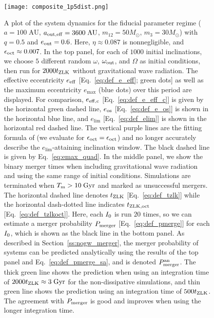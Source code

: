 \documentclass[
        fleqn,
        usenatbib,
    ]{mnras}
\newlength{\colummwidth}
\begin{document}
\begin{figure}
    \centering
    \texttt{[image: composite\_1p5dist.png]}
    \caption{A plot of the system dynamics for the fiducial parameter regime ($a
    = 100\;\mathrm{AU}$, $a_{\rm out, eff} = 3600\;\mathrm{AU}$, $m_{12} =
    50M_{\odot}$, $m_3 = 30M_{\odot}$) with $q = 0.5$ and $e_{\rm out} = 0.6$.
    Here, $\eta \approx 0.087$ is nonnegligible, and $\epsilon_{\rm oct} \approx
    0.007$. In the top panel, for each of $1000$ initial inclinations, we choose
    $5$ different random $\omega$, $\omega_{\rm out}$, and $\Omega$ as initial
    conditions, then run for $2000t_{\rm ZLK}$ without gravitational wave
    radiation. The effective eccentricity $e_{\rm eff}$
    [Eq.~\eqref{eq:def_e_eff}; green dots] as well as the maximum eccentricity
    $e_{\max}$ (blue dots) over this period are displayed. For comparison,
    $e_{\rm eff, c}$ [Eq.~\eqref{eq:def_e_eff_c}] is given by the horizontal
    green dashed line, $e_{\rm os}$ [Eq.~\eqref{eq:def_e_os}] is shown in the
    horizontal blue line, and $e_{\lim}$ [Eq.~\eqref{eq:def_elim}] is shown in
    the horizontal red dashed line. The vertical purple lines are the fitting
    formula of \citet{MLL16} (we evaluate for $\epsilon_{\rm oct} =
    \epsilon_{\rm oct}$) and no longer accurately describe the
    $e_{\lim}$-attaining inclination window. The black dashed line is given by
    Eq.~\eqref{eq:emax_quad}. In the middle panel, we show the binary merger
    times when including gravitational wave radiation and using the same range
    of initial conditions. Simulations are terminated when $T_{\rm m} >
    10\;\mathrm{Gyr}$ and marked as unsuccessful mergers. The horizontal dashed
    line denotes $t_{\rm ZLK}$ [Eq.~\eqref{eq:def_tzlk}] while the horizontal
    dash-dotted line indicates $t_{\rm ZLK, oct}$ [Eq.~\eqref{eq:def_tzlkoct}].
    Here, each $I_{\rm 0}$ is run $20$ times, so we can estimate a merger
    probability $P_{\rm merger}$ [Eq.~\eqref{eq:def_pmerge}] for each $I_{\rm
    0}$, which is shown as the black line in the bottom panel. As described in
    Section~\ref{ss:nogw_merger}, the merger probability of systems can be
    predicted analytically using the results of the top panel and
    Eq.~\eqref{eq:def_pmerge_sa}, and is denoted $P_{\rm merger}^{\rm an}$. The thick
    green line shows the prediction when using an integration time of $2000
    t_{\rm ZLK} \approx 3\;\mathrm{Gyr}$ for the non-dissipative simulations,
    and thin green line shows the prediction using an integration time of $500
    t_{\rm ZLK}$. The agreement with $P_{\rm merger}$ is good and improves when
    using the longer integration time.
    }\label{fig:composite_dist}
\end{figure}
\end{document}
